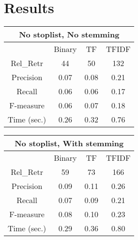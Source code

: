 \documentclass[12pt, a4paper]{article}
\begin{document}
\section{Results}
\begin{multicols}{2}
  \def\arraystretch{1.3}
  \begin{table}[H]
    \begin{tabular}{|c||c||c||c|}
    \hline
    \multicolumn{4}{|c|}{\textbf{No} stoplist, \textbf{No} stemming} \\ \hline
                & Binary & TF   & TFIDF \\ \hline
    Rel\_Retr   & 44     & 50   & 132   \\ \hline
    Precision   & 0.07   & 0.08 & 0.21  \\ \hline
    Recall      & 0.06   & 0.06 & 0.17  \\ \hline
    F-measure   & 0.06   & 0.07 & 0.18  \\ \hline\hline
    Time (sec.) & 0.26   & 0.32 & 0.76  \\ \hline
    \end{tabular}
  \end{table}

  \columnbreak

  \begin{table}[H]
    \begin{tabular}{|c||c||c||c|}
    \hline
    \multicolumn{4}{|c|}{\textbf{No} stoplist, \textbf{With} stemming} \\ \hline
                & Binary & TF   & TFIDF \\ \hline
    Rel\_Retr   & 59     & 73   & 166   \\ \hline
    Precision   & 0.09   & 0.11 & 0.26  \\ \hline
    Recall      & 0.07   & 0.09 & 0.21  \\ \hline
    F-measure   & 0.08   & 0.10 & 0.23  \\ \hline\hline
    Time (sec.) & 0.29   & 0.36 & 0.80  \\ \hline
    \end{tabular}
  \end{table}
\end{multicols}
\end{document}
